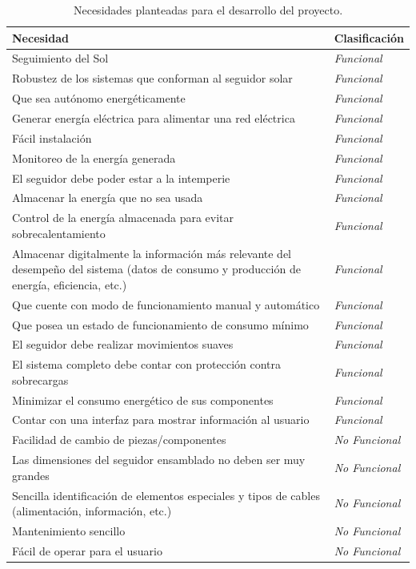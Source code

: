 \begin{table}[H]
	\centering
	\caption{Necesidades planteadas para el desarrollo del proyecto.}
	\begin{tabular}{@{}|p{11cm}|p{2.5cm}|} 
		\hline
		\textbf{Necesidad} & \textbf{Clasificación} \\
		\hline \hline
		Seguimiento del Sol & \textit{Funcional} \\ \hline
		Robustez de los sistemas que conforman al seguidor solar & \textit{Funcional} \\ \hline
		Que sea autónomo energéticamente & \textit{Funcional} \\ \hline
		Generar energía eléctrica para alimentar una red eléctrica & \textit{Funcional} \\ \hline
		Fácil instalación & \textit{Funcional} \\ \hline
		Monitoreo de la energía generada & \textit{Funcional} \\ \hline
		El seguidor debe poder estar a la intemperie & \textit{Funcional} \\ \hline
		Almacenar la energía que no sea usada & \textit{Funcional} \\ \hline
		Control de la energía almacenada para evitar sobrecalentamiento & \textit{Funcional} \\ \hline
		Almacenar digitalmente la información más relevante del desempeño del sistema (datos de consumo y producción de energía, eficiencia, etc.) & \textit{Funcional} \\ \hline
		Que cuente con modo de funcionamiento manual y automático & \textit{Funcional} \\ \hline
		Que posea un estado de funcionamiento de consumo mínimo & \textit{Funcional} \\ \hline
		El seguidor debe realizar movimientos suaves & \textit{Funcional} \\ \hline
		El sistema completo debe contar con protección contra sobrecargas & \textit{Funcional} \\ \hline
		Minimizar el consumo energético de sus componentes & \textit{Funcional} \\ \hline
		Contar con una interfaz para mostrar información al usuario & \textit{Funcional} \\ \hline
		Facilidad de cambio de piezas/componentes & \textit{No Funcional} \\ \hline
		Las dimensiones del seguidor ensamblado no deben ser muy grandes & \textit{No Funcional} \\ \hline
		Sencilla identificación de elementos especiales y tipos de cables (alimentación, información, etc.) & \textit{No Funcional} \\ \hline
		Mantenimiento sencillo & \textit{No Funcional} \\ \hline
		Fácil de operar para el usuario & \textit{No Funcional} \\ \hline
	\end{tabular}		
	\label{tabla:needs}
\end{table}


